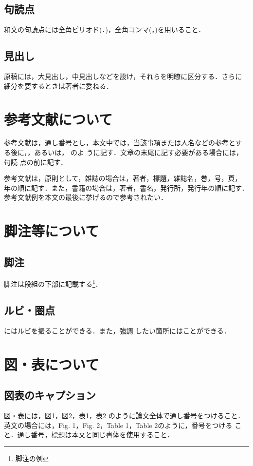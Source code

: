 \documentclass[a4j, 12Q, twocolumn, twoside]{jsarticle}
\begin{document}
\subsection{句読点}
和文の句読点には全角ピリオド(．)，全角コンマ(，)を用いること．

\subsection{見出し}
原稿には，大見出し，中見出しなどを設け，それらを明瞭に区分する．さらに
細分を要するときは著者に委ねる．

\section{参考文献について}
参考文献は，通し番号とし，本文中では，当該事項または人名などの参考とす
る後に，\cite{okumura}，あるいは，\cite{takeuchi1986new,sutherland2011scrum} のよ
うに記す．文章の末尾に記す必要がある場合には，句読
点の前に記す\cite{IT人材白書2012}．

参考文献は，原則として，雑誌の場合は，著者，標題，雑誌名，巻，号，頁，
年の順に記す．また，書籍の場合は，著者，書名，発行所，発行年の順に記す．
参考文献例を本文の最後に挙げるので参考されたい．

\section{脚注等について}
\subsection{脚注}
脚注は段組の下部に記載する\footnote{脚注の例}．

\subsection{ルビ・圏点}
にはルビを振ることができる．また，強調
したい箇所にはことができる．

\section{図・表について}
\subsection{図表のキャプション}
図・表には，図1，図2，表1，表2 のように論文全体で通し番号をつけること．
英文の場合には，Fig. 1，Fig. 2，Table 1，Table 2のように，番号をつける
こと．通し番号，標題は本文と同じ書体を使用すること．
\end{document}
